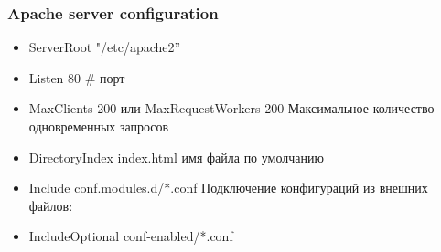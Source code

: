 \begin{frame}[fragile]
        \frametitle{Apache server configuration}
\begin{itemize}
    \item 
ServerRoot "/etc/apache2” 
    \item Listen 80 \# порт
    \item MaxClients 200  или MaxRequestWorkers 200 
Максимальное количество одновременных запросов
    \item DirectoryIndex index.html имя файла по умолчанию
    \item Include conf.modules.d/*.conf Подключение конфигураций из внешних файлов:
    \item IncludeOptional conf-enabled/*.conf
\end{itemize}
\end{frame}

